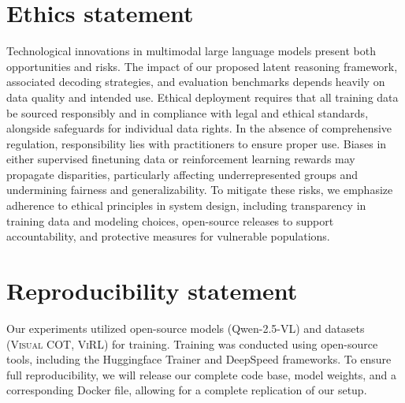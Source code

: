 \section{Ethics statement}
Technological innovations in multimodal large language models present both opportunities and risks. The impact of our proposed latent reasoning framework, associated decoding strategies, and evaluation benchmarks depends heavily on data quality and intended use. Ethical deployment requires that all training data be sourced responsibly and in compliance with legal and ethical standards, alongside safeguards for individual data rights. In the absence of comprehensive regulation, responsibility lies with practitioners to ensure proper use. Biases in either supervised finetuning data or reinforcement learning rewards may propagate disparities, particularly affecting underrepresented groups and undermining fairness and generalizability. To mitigate these risks, we emphasize adherence to ethical principles in system design, including transparency in training data and modeling choices, open-source releases to support accountability, and protective measures for vulnerable populations.

\section{Reproducibility statement}
Our experiments utilized open-source models (Qwen-2.5-VL) and datasets (\textsc{Visual COT}, \textsc{ViRL}) for training. Training was conducted using open-source tools, including the Huggingface Trainer and DeepSpeed frameworks. To ensure full reproducibility, we will release our complete code base, model weights, and a corresponding Docker file, allowing for a complete replication of our setup.
